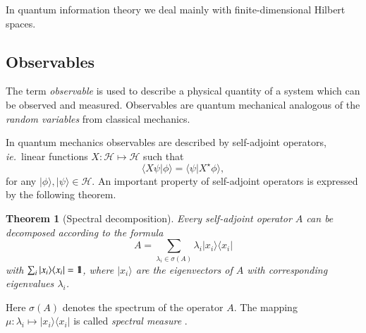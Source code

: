 \documentclass[final,5p,times]{elsarticle}
\newcommand{\ket}[1]{\ensuremath{|#1\rangle}}
\newcommand{\bra}[1]{\ensuremath{\langle#1|}}
\newcommand{\1}{{\rm 1\hspace{-0.9mm}l}}
\newcommand{\Id}{\1}
\newcommand{\HS}[1]{\ensuremath{\mathcal{#1}}} %
\newcommand{\ie}{\emph{ie.}}
\newcommand{\Observ}[1]{\ensuremath{#1}}
\newcommand{\Spectrum}[1]{\ensuremath{\sigma(#1)}}
\newcommand{\Spec}[1]{\Spectrum{#1}}
\newcommand{\ketbra}[2]{\ensuremath{\ket{#1}\bra{#2}}}
\newcommand{\proj}[1]{\ensuremath{\ketbra{#1}{#1}}}
\newcommand{\Proj}[1]{\proj{#1}}
\newcommand{\iner}[2]{\braket{#1}{#2}}
\newcommand{\Iner}[2]{\iner{#1}{#2}}
\newcommand{\braket}[2]{\ensuremath{\langle#1|#2\rangle}}
\newtheorem{theorem}{Theorem}
\begin{document}
In quantum information theory we deal mainly with finite-dimensional Hilbert
spaces.

\subsection{Observables}
The term \emph{observable} is used to describe a physical
quantity of a system which can be observed and measured. Observables are
quantum mechanical analogous of the \emph{random variables} from classical mechanics.

In quantum mechanics observables are described by self-adjoint operators,
\ie\ linear functions $X:\HS{H}\mapsto\HS{H}$ such that
\begin{equation}
\Iner{X\psi}{\phi}=\Iner{\psi}{X^\star\phi},
\label{eqn:selfadj}
\end{equation}
for any $\ket{\phi},\ket{\psi}\in\HS{H}$. An important property of self-adjoint
operators is expressed by the following theorem.

\begin{theorem}[Spectral decomposition]
Every self-adjoint operator $\Observ{A}$ can be decomposed according to the
formula
\begin{equation}
\Observ{A} = \sum_{\lambda_i\in\Spec{\Observ{A}}} \lambda_i\proj{x_i}
\end{equation}
with $\sum_i\Proj{x_i}=\Id$, where $\ket{x_i}$ are the eigenvectors of
$\Observ{A}$ with corresponding eigenvalues $\lambda_i$.
\end{theorem}
Here $\sigma(A)$ denotes the spectrum of the operator $A$. The mapping
$\mu:\lambda_i\mapsto \Proj{x_i}$ is called \emph{spectral
measure} \cite{mlak}.
\end{document}
